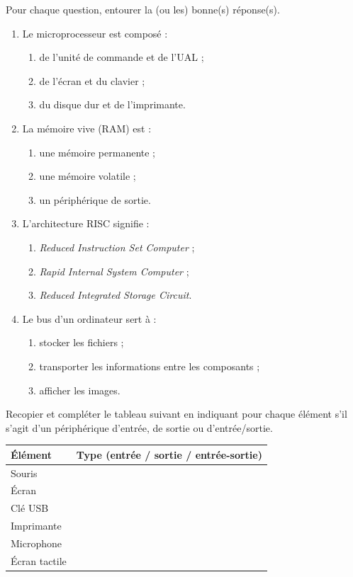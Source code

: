 \documentclass[11pt]{article}
\begin{document}
\begin{exercice}[QCM]
Pour chaque question, entourer la (ou les) bonne(s) réponse(s).
\begin{enumerate}
  \item Le microprocesseur est composé :
  \begin{enumerate}
    \item[a)] de l'unité de commande et de l'UAL ;
    \item[b)] de l'écran et du clavier ;
    \item[c)] du disque dur et de l'imprimante.
  \end{enumerate}
  \item La mémoire vive (RAM) est :
  \begin{enumerate}
    \item[a)] une mémoire permanente ;
    \item[b)] une mémoire volatile ;
    \item[c)] un périphérique de sortie.
  \end{enumerate}
  \item L'architecture RISC signifie :
  \begin{enumerate}
    \item[a)] \emph{Reduced Instruction Set Computer} ;
    \item[b)] \emph{Rapid Internal System Computer} ;
    \item[c)] \emph{Reduced Integrated Storage Circuit}.
  \end{enumerate}
  \item Le bus d'un ordinateur sert à :
  \begin{enumerate}
    \item[a)] stocker les fichiers ;
    \item[b)] transporter les informations entre les composants ;
    \item[c)] afficher les images.
  \end{enumerate}
\end{enumerate}
\end{exercice}

\begin{exercice}
Recopier et compléter le tableau suivant en indiquant pour chaque élément s'il s'agit d'un périphérique d'entrée, de sortie ou d'entrée/sortie.
\begin{center}
\begin{tabular}{|l|c|}
\hline
\textbf{Élément} & \textbf{Type (entrée / sortie / entrée-sortie)} \\
\hline
Souris & \\
\hline
Écran & \\
\hline
Clé USB & \\
\hline
Imprimante & \\
\hline
Microphone & \\
\hline
Écran tactile & \\
\hline
\end{tabular}
\end{center}
\end{exercice}
\end{document}
